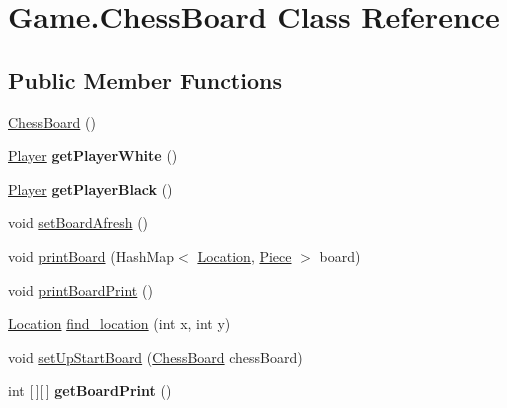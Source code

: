 \hypertarget{class_game_1_1_chess_board}{}\section{Game.\+Chess\+Board Class Reference}
\label{class_game_1_1_chess_board}
\subsection*{Public Member Functions}
\begin{DoxyCompactItemize}
\item 
\hyperlink{class_game_1_1_chess_board_af03bbcf15fe65eb707758928b92556d7}{Chess\+Board} ()
\item 
\mbox{\label{class_game_1_1_chess_board_a6cd8d8698cb3613f1ea0c6ff12ff2bad}} 
\hyperlink{class_game_1_1_player}{Player} {\bfseries get\+Player\+White} ()
\item 
\mbox{\label{class_game_1_1_chess_board_a7e03a5285b591f072128fe7fc1afcfa0}} 
\hyperlink{class_game_1_1_player}{Player} {\bfseries get\+Player\+Black} ()
\item 
void \hyperlink{class_game_1_1_chess_board_a56eeb955a8ced4615f314e96e1d0fb0d}{set\+Board\+Afresh} ()
\item 
void \hyperlink{class_game_1_1_chess_board_ac47067200b06bc4d11ca660c7a409956}{print\+Board} (Hash\+Map$<$ \hyperlink{class_game_1_1_location}{Location}, \hyperlink{class_game_1_1_piece}{Piece} $>$ board)
\item 
void \hyperlink{class_game_1_1_chess_board_abe952ff3498a25cf31170ff416ca6954}{print\+Board\+Print} ()
\item 
\hyperlink{class_game_1_1_location}{Location} \hyperlink{class_game_1_1_chess_board_a021ffe2d9253de4c5a59e58c6dd52730}{find\+\_\+location} (int x, int y)
\item 
void \hyperlink{class_game_1_1_chess_board_a9ec942366d90c6dca4c1da936e040474}{set\+Up\+Start\+Board} (\hyperlink{class_game_1_1_chess_board}{Chess\+Board} chess\+Board)
\item 
\mbox{\label{class_game_1_1_chess_board_a3292913ce4081ea271aba5295cafaf41}} 
int \mbox{[}$\,$\mbox{]}\mbox{[}$\,$\mbox{]} {\bfseries get\+Board\+Print} ()
\item 
\mbox{\label{class_game_1_1_chess_board_ac66d60d971579df2d51acfb2796f6bda}} 

\end{DoxyCompactItemize}
